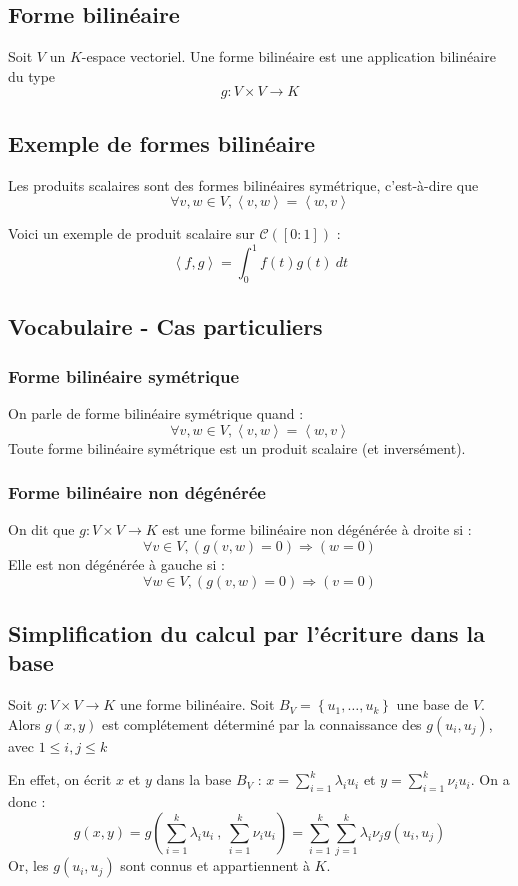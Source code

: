 \documentclass[a4paper,10pt]{article}
\newcommand{\ap}{ \rightarrow} %
\newcommand{\grp}[1]{\left\langle #1 \right\rangle} %
\newcommand{\set}[1]{\left\lbrace #1 \right\rbrace } %
\newcommand{\so}{\Rightarrow} %
\begin{document}
  \subsection{Forme bilinéaire}
   Soit $V$ un $K$-espace vectoriel. Une forme bilinéaire est une application bilinéaire du type
    $$g:V\times V \ap K$$

  \subsection{Exemple de formes bilinéaire}
   Les produits scalaires sont des formes bilinéaires symétrique, c'est-à-dire que
    $$\forall v,w \in V, \grp{v,w}=\grp{w,v}$$

   Voici un exemple de produit scalaire sur $\mathcal{C}([0:1])$ :
    $$\grp{f,g}=\int^1_0 f(t)g(t)\:dt$$

  \subsection{Vocabulaire - Cas particuliers}
   \subsubsection{Forme bilinéaire symétrique}
    On parle de forme bilinéaire symétrique quand :
     $$\forall v,w \in V, \grp{v,w}=\grp{w,v}$$
    Toute forme bilinéaire symétrique est un produit scalaire (et inversément).

   \subsubsection{Forme bilinéaire non dégénérée}
    On dit que $g:V\times V\ap K$ est une forme bilinéaire non dégénérée à droite si :
     $$\forall v \in V, (g(v,w)=0) \so (w=0)$$
    Elle est non dégénérée à gauche si :
     $$\forall w\in V, (g(v,w)=0) \so (v=0)$$

  \subsection{Simplification du calcul par l'écriture dans la base}
   Soit $g:V \times V \ap K$ une forme bilinéaire. Soit $B_V=\set{u_1, \hdots, u_k}$ une base de $V$. Alors $g(x,y)$ est complétement déterminé par la connaissance des $g(u_i,u_j)$, avec $1\leq i,j\leq k$

   En effet, on écrit $x$ et $y$ dans la base $B_V$ : $x=\sum^{k}_{i=1}\lambda_i u_i$ et $y=\sum^{k}_{i=1} \nu_i u_i$. On a donc :
    $$g(x,y)=g\left( \sum^{k}_{i=1}\lambda_i u_i ~,~ \sum^{k}_{i=1} \nu_i u_i\right)=\sum^{k}_{i=1}\sum^{k}_{j=1} \lambda_i \nu_j g(u_i,u_j)$$
   Or, les $g(u_i,u_j)$ sont connus et appartiennent à $K$.
\end{document}
